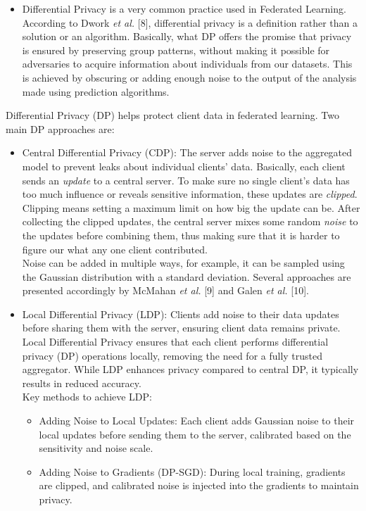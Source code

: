 \documentclass[conference]{IEEEtran}
\begin{document}
\begin{itemize}
    \item Differential Privacy is a very common practice used in Federated Learning. According to Dwork \textit{et al.} [8], differential privacy is a definition rather than a solution or an algorithm. Basically, what DP offers the promise that privacy is ensured by preserving group patterns, without making it possible for adversaries to acquire information about individuals from our datasets. This is achieved by obscuring or adding enough noise to the output of the analysis made using prediction algorithms.
\end{itemize}

Differential Privacy (DP) helps protect client data in federated learning. Two main DP approaches are:
\begin{itemize}
    \item Central Differential Privacy (CDP): The server adds noise to the aggregated model to prevent leaks about individual clients' data. Basically, each client sends an \textit{update} to a central server. To make sure no single client's data has too much influence or reveals sensitive information, these updates are \textit{clipped}. Clipping means setting a maximum limit on how big the update can be. After collecting the clipped updates, the central server mixes some random \textit{noise} to the updates before combining them, thus making sure that it is harder to figure our what any one client contributed.\\
    
    Noise can be added in multiple ways, for example, it can be sampled using the Gaussian distribution with a standard deviation. Several approaches are presented accordingly by McMahan \textit{et al.} [9] and Galen \textit{et al.} [10].\\
    
    \item Local Differential Privacy (LDP): Clients add noise to their data updates before sharing them with the server, ensuring client data remains private.
    Local Differential Privacy ensures that each client performs differential privacy (DP) operations locally, removing the need for a fully trusted aggregator. While LDP enhances privacy compared to central DP, it typically results in reduced accuracy.\\

    Key methods to achieve LDP:
    \begin{itemize}
        \item Adding Noise to Local Updates: Each client adds Gaussian noise to their local updates before sending them to the server, calibrated based on the sensitivity and noise scale.
        \item Adding Noise to Gradients (DP-SGD): During local training, gradients are clipped, and calibrated noise is injected into the gradients to maintain privacy. \\
    \end{itemize}


\end{itemize}
\end{document}
